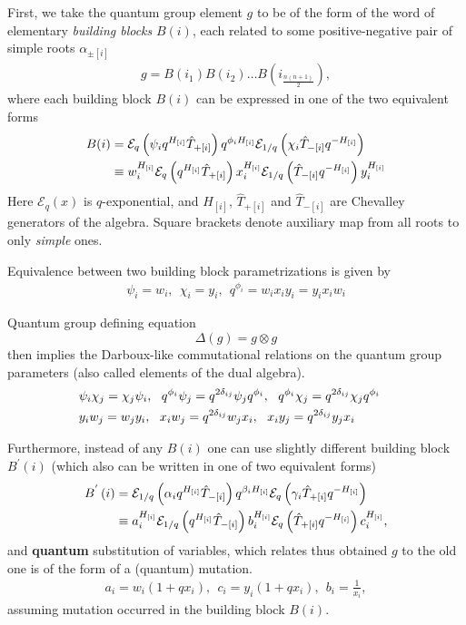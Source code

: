 \documentclass{article}
\newcommand{\lb}{\left (}
\newcommand{\rb}{\right )}
\newcommand{\lsb}{\left [}
\newcommand{\rsb}{\right ]}
\newcommand{\be}{\begin{eqnarray}}
\newcommand{\ee}{\end{eqnarray}}
\newcommand {\?}{\textit{???}}
\newcommand{\me}[0]{\mathcal{E}}
\newcommand{\hT}[0]{\hat{T}}
\newcommand{\Bp}[1]{B^{'}\lb #1 \rb}
\def\dg{\Delta (g)}
\def\gog{g \otimes g}
\begin{document}
First, we take the quantum group element $g$ to be of the form
of the word of elementary {\it building blocks} $B(i)$, each related to some positive-negative pair
of simple roots $\alpha_{\pm \lsb i \rsb}$
\be
g = B \lb i_1 \rb B \lb i_2 \rb \dots B \lb i_{\frac{n(n + 1)}{2}} \rb,
\ee
where each building block $B(i)$ can be expressed in one of the two equivalent forms
\begin{align}
B(i) & = \me_q \lb \psi_i q^{H_{[i]}} \hT_{+[i]} \rb q^{\phi_i H_{[i]}} \me_{1/q} \lb \chi_i \hT_{-[i]} q^{-H_{[i]}} \rb \\ \notag
& \equiv
w_i^{H_{[i]}} \me_q \lb q^{H_{[i]}} \hT_{+[i]} \rb x_i^{H_{[i]}} \me_{1/q} \lb \hT_{-[i]} q^{-H_{[i]}} \rb y_i^{H_{[i]}}
\end{align}
Here $\me_q(x)$ is $q$-exponential, and $H_{[i]}$, $\hT_{+[i]}$ and $\hT_{-[i]}$ are Chevalley generators of the algebra.
Square brackets denote auxiliary map from all roots to only {\it simple} ones.

Equivalence between two building block parametrizations is given by
\be
\psi_i = w_i,\ \ \chi_i = y_i,\ \ q^{\phi_i} = w_i x_i y_i = y_i x_i w_i
\ee

Quantum group defining equation
\begin{equation}
\label{eq:q-group-def}
\dg = \gog
\end{equation}
 then implies the Darboux-like commutational
relations on the quantum group parameters (also called elements of the dual algebra).
\begin{align}
& \psi_i \chi_j = \chi_j \psi_i, \ \ q^{\phi_i} \psi_j = q^{2 \delta_{ij}} \psi_j q^{\phi_i}, \ \
q^{\phi_i} \chi_j = q^{2 \delta_{ij}} \chi_j q^{\phi_i} & \\ \notag &
y_i w_j = w_j y_i, \ \ x_i w_j = q^{2\delta_{ij}} w_j x_i, \ \ x_i y_j = q^{2\delta_{ij}} y_j x_i
\end{align}

Furthermore, instead of any $B(i)$ one can use slightly different building block $\Bp{i}$
(which also can be written in one of two equivalent forms)
\begin{align}
\Bp{i} & = \me_{1/q} \lb \alpha_i q^{H_{[i]}} \hT_{-[i]} \rb q^{\beta_i H_{[i]}} \me_q \lb \gamma_i \hT_{+[i]} q^{-H_{[i]}} \rb  \\ \notag & \equiv
a_i^{H_{[i]}} \me_{1/q} \lb q^{H_{[i]}} \hT_{-[i]} \rb b_i^{H_{[i]}} \me_q \lb  \hT_{+[i]} q^{-H_{[i]}} \rb c_i^{H_{[i]}},
\end{align}
and {\bf quantum} substitution of variables, which relates thus obtained $g$ to the old one
is of the form of a (quantum) mutation.
\be
a_i = w_i(1 + q x_i), \ \ c_i = y_i(1 + q x_i), \ \ b_i = \frac{1}{x_i},
\ee 
assuming mutation occurred in the building block $B(i)$.
\end{document}

